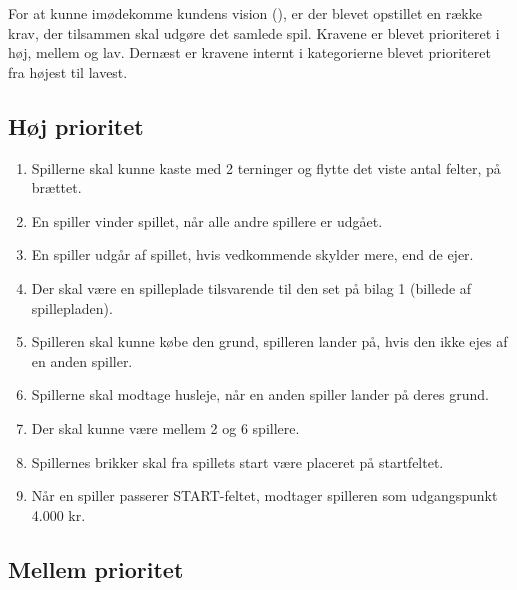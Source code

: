 For at kunne imødekomme kundens vision (\cite{noauthor_cdio_nodate}), er der blevet opstillet en række krav, der tilsammen skal udgøre det samlede spil. Kravene er blevet prioriteret i høj, mellem og lav. Dernæst er kravene internt i kategorierne blevet prioriteret fra højest til lavest. 


\subsection{Høj prioritet}

\begin{enumerate}
    \item Spillerne skal kunne kaste med 2 terninger og flytte det viste antal felter, på brættet.\label{RQ01}
    \item En spiller vinder spillet, når alle andre spillere er udgået.
    \item En spiller udgår af spillet, hvis vedkommende skylder mere, end de ejer.
    \item Der skal være en spilleplade tilsvarende til den set på bilag 1 (billede af spillepladen).
    \item Spilleren skal kunne købe den grund, spilleren lander på, hvis den ikke ejes af en anden spiller.
    \item Spillerne skal modtage husleje, når en anden spiller lander på deres grund.
    \item Der skal kunne være mellem 2 og 6 spillere.
    \item Spillernes brikker skal fra spillets start være placeret på startfeltet.
    \item Når en spiller passerer START-feltet, modtager spilleren som udgangspunkt 4.000 kr.
\end{enumerate}

\subsection{Mellem prioritet}

